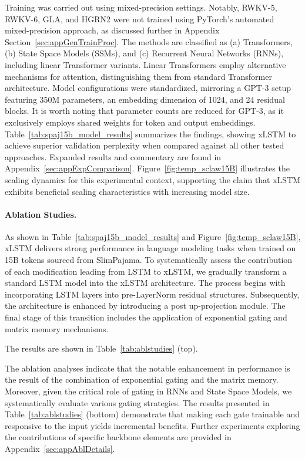 Training was carried out using mixed-precision settings. Notably, RWKV-5, RWKV-6, GLA, and HGRN2 were not trained using PyTorch’s automated mixed-precision approach, as discussed further in Appendix Section~\ref{sec:appGenTrainProc}. The methods are classified as (a) Transformers, (b) State Space Models (SSMs), and (c) Recurrent Neural Networks (RNNs), including linear Transformer variants. Linear Transformers employ alternative mechanisms for attention, distinguishing them from standard Transformer architecture. Model configurations were standardized, mirroring a GPT-3 setup featuring 350M parameters, an embedding dimension of 1024, and 24 residual blocks. It is worth noting that parameter counts are reduced for GPT-3, as it exclusively employs shared weights for token and output embeddings. Table~\ref{tab:spaj15b_model_results} summarizes the findings, showing xLSTM to achieve superior validation perplexity when compared against all other tested approaches. Expanded results and commentary are found in Appendix~\ref{sec:appExpComparison}. Figure~\ref{fig:temp_sclaw15B} illustrates the scaling dynamics for this experimental context, supporting the claim that xLSTM exhibits beneficial scaling characteristics with increasing model size.

\paragraph{Ablation Studies.}
As shown in Table~\ref{tab:spaj15b_model_results} and Figure~\ref{fig:temp_sclaw15B}, xLSTM delivers strong performance in language modeling tasks when trained on 15B tokens sourced from SlimPajama. To systematically assess the contribution of each modification leading from LSTM to xLSTM, we gradually transform a standard LSTM model into the xLSTM architecture. The process begins with incorporating LSTM layers into pre-LayerNorm residual structures. Subsequently, the architecture is enhanced by introducing a post up-projection module. The final stage of this transition includes the application of exponential gating and matrix memory mechanisms.

The results are shown in Table~\ref{tab:ablstudies} (top). 

The ablation analyses indicate that the notable enhancement in performance is the result of the combination of exponential gating and the matrix memory. Moreover, given the critical role of gating in RNNs and State Space Models, we systematically evaluate various gating strategies. The results presented in Table~\ref{tab:ablstudies} (bottom) demonstrate that making each gate trainable and responsive to the input yields incremental benefits. Further experiments exploring the contributions of specific backbone elements are provided in Appendix~\ref{sec:appAblDetails}.

